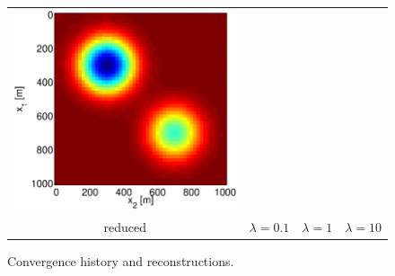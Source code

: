 \documentclass{iopart}
\begin{document}
\begin{figure}
\begin{tabular}{cccc}
\includegraphics[scale=.2]{./figs/2D_exp1_g}\\
{\small reduced}&{\small $\lambda=0.1$}&{\small $\lambda=1$}&{\small $\lambda=10$}\\
\end{tabular}
\caption{Convergence history and reconstructions.}
\label{fig:2D_exp1b}
\end{figure}

\clearpage


\end{document}
